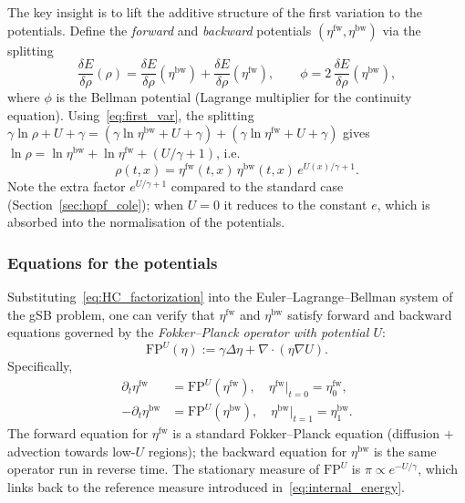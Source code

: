 \documentclass[11pt,a4paper]{article}
\newcommand{\fw}{{\mathrm{fw}}}   %
\newcommand{\bw}{{\mathrm{bw}}}   %
\newcommand{\FPU}{\mathrm{FP}^U}  %
\begin{document}
The key insight is to lift the additive structure of the first variation
to the potentials.  Define the \emph{forward} and \emph{backward} potentials
$(\eta^\fw, \eta^\bw)$ via the splitting
\begin{equation}\label{eq:HC_split}
  \frac{\delta E}{\delta\rho}(\rho)
  = \frac{\delta E}{\delta\rho}(\eta^\bw)
  + \frac{\delta E}{\delta\rho}(\eta^\fw),
  \qquad
  \phi = 2\,\frac{\delta E}{\delta\rho}(\eta^\bw),
\end{equation}
where $\phi$ is the Bellman potential (Lagrange multiplier for the continuity
equation).  Using~\eqref{eq:first_var}, the splitting
$\gamma\ln\rho + U + \gamma
 = (\gamma\ln\eta^\bw + U + \gamma) + (\gamma\ln\eta^\fw + U + \gamma)$
gives $\ln\rho = \ln\eta^\bw + \ln\eta^\fw + (U/\gamma + 1)$, i.e.
\begin{equation}\label{eq:HC_factorization}
  \boxed{
  \rho(t,x) = \eta^\fw(t,x)\,\eta^\bw(t,x)\,e^{U(x)/\gamma + 1}.
  }
\end{equation}
Note the extra factor $e^{U/\gamma+1}$ compared to the standard case
(Section~\ref{sec:hopf_cole}); when $U=0$ it reduces to the constant $e$,
which is absorbed into the normalisation of the potentials.

\subsubsection*{Equations for the potentials}

Substituting~\eqref{eq:HC_factorization} into the Euler--Lagrange--Bellman
system of the gSB problem, one can verify that $\eta^\fw$ and $\eta^\bw$
satisfy forward and backward equations governed by the \emph{Fokker--Planck
operator with potential $U$}:
\begin{equation}\label{eq:FPU_operator}
  \FPU(\eta) := \gamma\Delta\eta + \nabla\cdot(\eta\nabla U).
\end{equation}
Specifically,
\begin{equation}\label{eq:HC_eqs}
  \begin{aligned}
   \partial_t\eta^\fw  &= \FPU(\eta^\fw),
     \quad \eta^\fw\big|_{t=0} = \eta^\fw_0,\\
  -\partial_t\eta^\bw  &= \FPU(\eta^\bw),
     \quad \eta^\bw\big|_{t=1} = \eta^\bw_1.
  \end{aligned}
\end{equation}
The forward equation for $\eta^\fw$ is a standard Fokker--Planck equation
(diffusion $+$ advection towards low-$U$ regions);
the backward equation for $\eta^\bw$ is the same operator run in reverse
time.  The stationary measure of $\FPU$ is $\pi \propto e^{-U/\gamma}$, which
links back to the reference measure introduced in~\eqref{eq:internal_energy}.
\end{document}
